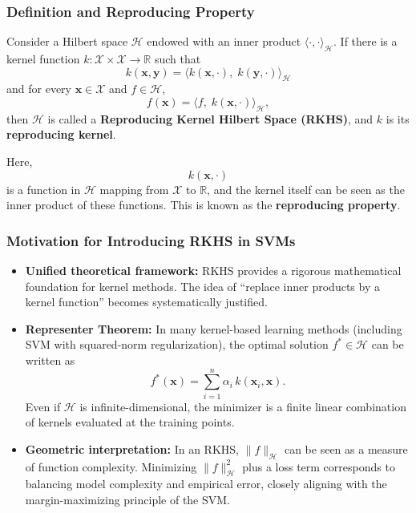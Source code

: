\documentclass[11pt]{article}
\begin{document}
\subsubsection{Definition and Reproducing Property}

Consider a Hilbert space \(\mathcal{H}\) endowed with an inner product \(\langle \cdot,\cdot\rangle_{\mathcal{H}}\). If there is a kernel function \(k: \mathcal{X}\times\mathcal{X}\to\mathbb{R}\) such that
\[
k(\mathbf{x}, \mathbf{y}) 
= \bigl\langle k(\mathbf{x}, \cdot), \; k(\mathbf{y}, \cdot)\bigr\rangle_{\mathcal{H}}
\]
and for every \(\mathbf{x} \in \mathcal{X}\) and \(f \in \mathcal{H}\),
\[
f(\mathbf{x}) 
= \bigl\langle f,\; k(\mathbf{x}, \cdot)\bigr\rangle_{\mathcal{H}},
\]
then \(\mathcal{H}\) is called a \textbf{Reproducing Kernel Hilbert Space (RKHS)}, and \(k\) is its \textbf{reproducing kernel}.

Here,
\[
k(\mathbf{x}, \cdot)
\]
is a function in \(\mathcal{H}\) mapping from \(\mathcal{X}\) to \(\mathbb{R}\), and the kernel itself can be seen as the inner product of these functions. This is known as the \textbf{reproducing property}.

\subsubsection{Motivation for Introducing RKHS in SVMs}

\begin{itemize}
    \item \textbf{Unified theoretical framework:} RKHS provides a rigorous mathematical foundation for kernel methods. The idea of “replace inner products by a kernel function” becomes systematically justified.
    \item \textbf{Representer Theorem:} In many kernel-based learning methods (including SVM with squared-norm regularization), the optimal solution \(f^*\in\mathcal{H}\) can be written as
    \[
    f^*(\mathbf{x}) 
    = \sum_{i=1}^n \alpha_i\, k(\mathbf{x}_i, \mathbf{x}).
    \]
    Even if \(\mathcal{H}\) is infinite-dimensional, the minimizer is a finite linear combination of kernels evaluated at the training points.
    \item \textbf{Geometric interpretation:} In an RKHS, \(\|f\|_{\mathcal{H}}\) can be seen as a measure of function complexity. Minimizing \(\|f\|_{\mathcal{H}}^2\) plus a loss term corresponds to balancing model complexity and empirical error, closely aligning with the margin-maximizing principle of the SVM.
\end{itemize}
\end{document}
